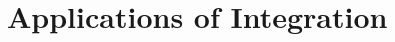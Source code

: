 \documentclass[12pt,a4paper,oneside]{report}
\begin{document}
\chapter{Applications of Integration}
\makenewpage
\makenewpage
\makenewpage
\makenewpage

\backmatter
\appendix
%  

\ifincludeMATOneEightThree
  
\fi

\ifincludeMATFourTwoOne
  
\fi



\end{document}
